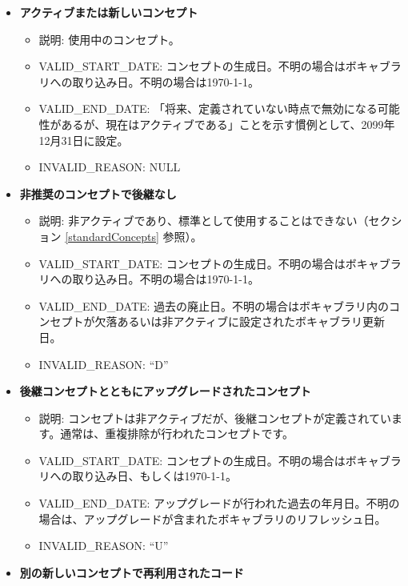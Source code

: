 \documentclass[
  11pt]{book}
\providecommand{\tightlist}{%
  \setlength{\itemsep}{0pt}\setlength{\parskip}{0pt}}
\theoremstyle{definition}
\theoremstyle{definition}
\theoremstyle{definition}
\theoremstyle{definition}
\theoremstyle{remark}
\begin{document}
\begin{itemize}
\tightlist
\item
  \textbf{アクティブまたは新しいコンセプト}

  \begin{itemize}
  \tightlist
  \item
    説明: 使用中のコンセプト。
  \item
    VALID\_START\_DATE: コンセプトの生成日。不明の場合はボキャブラリへの取り込み日。不明の場合は1970-1-1。
  \item
    VALID\_END\_DATE: 「将来、定義されていない時点で無効になる可能性があるが、現在はアクティブである」ことを示す慣例として、2099年12月31日に設定。
  \item
    INVALID\_REASON: NULL
  \end{itemize}
\item
  \textbf{非推奨のコンセプトで後継なし}

  \begin{itemize}
  \tightlist
  \item
    説明: 非アクティブであり、標準として使用することはできない（セクション \ref{standardConcepts} 参照）。
  \item
    VALID\_START\_DATE: コンセプトの生成日。不明の場合はボキャブラリへの取り込み日。不明の場合は1970-1-1。
  \item
    VALID\_END\_DATE: 過去の廃止日。不明の場合はボキャブラリ内のコンセプトが欠落あるいは非アクティブに設定されたボキャブラリ更新日。
  \item
    INVALID\_REASON: ``D''
  \end{itemize}
\item
  \textbf{後継コンセプトとともにアップグレードされたコンセプト}

  \begin{itemize}
  \tightlist
  \item
    説明: コンセプトは非アクティブだが、後継コンセプトが定義されています。通常は、重複排除が行われたコンセプトです。
  \item
    VALID\_START\_DATE: コンセプトの生成日。不明の場合はボキャブラリへの取り込み日、もしくは1970-1-1。
  \item
    VALID\_END\_DATE: アップグレードが行われた過去の年月日。不明の場合は、アップグレードが含まれたボキャブラリのリフレッシュ日。
  \item
    INVALID\_REASON: ``U''
  \end{itemize}
\item
  \textbf{別の新しいコンセプトで再利用されたコード}


\end{itemize}
\end{document}

